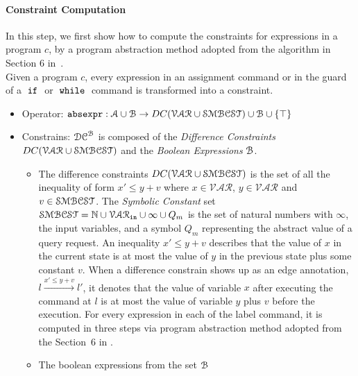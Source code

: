 \paragraph{Constraint Computation}
In this step, we first show how to compute the constraints for expressions in a program $c$,
by a program abstraction method adopted from the
algorithm in Section 6 in~\cite{sinn2017complexity}.
\\
Given a program $c$,
every expression in an assignment command or in the guard of a $\;\mathtt{if}\;$ or $\;\mathtt{while}\;$ command
is transformed into a constraint.

\begin{itemize}
\item Operator: $\mathtt{abs}{\mathtt{expr}} : \mathcal{A} \cup \mathcal{B} \to DC(\mathcal{VAR}  \cup \mathcal{SMBCST})\cup \mathcal{B} \cup \{\top\}$
%
\item Constrains: $\mathcal{DC}^{\mathcal{B}}$ is composed of the \emph{Difference Constraints} $DC(\mathcal{VAR}  \cup \mathcal{SMBCST})$ and the \emph{Boolean Expressions} $\mathcal{B}$.
%
\begin{itemize}
\item The difference constraints $DC(\mathcal{VAR}  \cup \mathcal{SMBCST})$ is the set of all the inequality of
form $x' \leq y + v$ where $x \in \mathcal{VAR} $, 
$y \in \mathcal{VAR}$ and $v \in \mathcal{SMBCST}$.
The \emph{Symbolic Constant} set $\mathcal{SMBCST} = \mathbb{N} \cup \mathcal{VAR}_{\mathtt{in}} \cup{\infty \cup{Q_m}}$
is the set of natural numbers with $\infty$, the input variables, and a symbol $Q_m$ representing the abstract value of a query request.
An inequality $x' \leq y + v$ describes that the value of $x$ in the current state is
at most the value of $y$ in the previous state plus some constant $v$.
When a difference constrain shows up as an edge annotation, $l \xrightarrow{x' \leq y + v} l'$,
it denotes that
the value of variable $x$
after executing the command at $l$ is at most
the value of variable $y$ plus $v$ before the execution.
For every expression in each of the label command, it is computed in three steps via program abstraction method adopted from the Section~6 in \cite{sinn2017complexity}. 
%
\item The boolean expressions from the set $\mathcal{B}$
%
\end{itemize}
\end{itemize}

